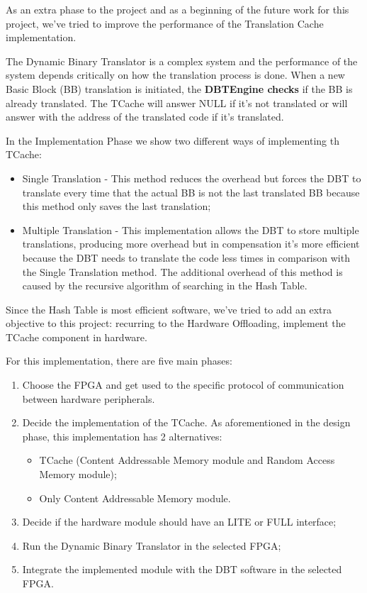 As an extra phase to the project and as a beginning of the future work for this project, we've tried to improve the performance of the Translation Cache implementation.

The Dynamic Binary Translator is a complex system and the performance of the system depends critically on how the translation process is done. 
When a new Basic Block (BB) translation is initiated, the \textbf{DBTEngine checks} if the BB is already translated. The TCache will answer NULL if it's not translated or will answer with the address of the translated code if it's translated. 

In the Implementation Phase we show two different ways of implementing th TCache:
\begin{itemize}
	\item Single Translation - This method reduces the overhead but forces the DBT to translate every time that the actual BB is not the last translated BB because this method only saves the last translation;
	\item Multiple Translation - This implementation allows the DBT to store multiple translations, producing more overhead but in compensation it's more efficient because the DBT needs to translate the code less times in comparison with the Single Translation method. The additional overhead of this method is caused by the recursive algorithm of searching in the Hash Table.
\end{itemize}

Since the Hash Table is most efficient software, we've tried to add an extra objective to this project: recurring to the Hardware Offloading, implement the TCache component in hardware.

For this implementation, there are five main phases:
\begin{enumerate}
	\item Choose the FPGA and get used to the specific protocol of communication between hardware peripherals.
	\item Decide the implementation of the TCache. As aforementioned in the design phase, this implementation has 2 alternatives:
	\begin{itemize}
		\item TCache (Content Addressable Memory module and Random Access Memory module);
		\item Only Content Addressable Memory module.
	\end{itemize}
	\item Decide if the hardware module should have an LITE or FULL interface;
	\item Run the Dynamic Binary Translator in the selected FPGA;
	\item Integrate the implemented module with the DBT software in the selected FPGA.
\end{enumerate}

